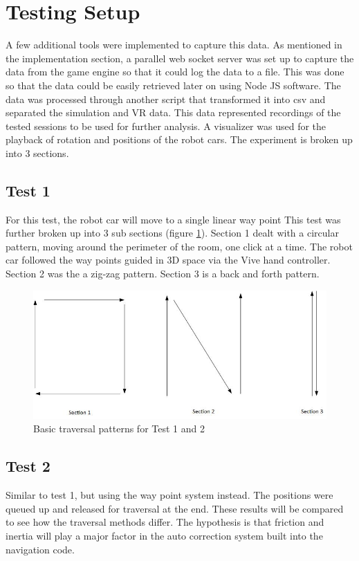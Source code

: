 \documentclass[10pt,a4paper]{article}
\begin{document}
	\section{Testing Setup}
	A few additional tools were implemented to capture this data. As mentioned in the implementation section, a parallel web socket server was set up to capture the data from the game engine so that it could log the data to a file. This was done so that the data could be easily retrieved later on using Node JS software. The data was processed through another script that transformed it into csv and separated the simulation and VR data. This data represented recordings of the tested sessions to be used for further analysis. A visualizer was used for the playback of rotation and positions of the robot cars. The experiment is broken up into 3 sections.
	
	\subsection{Test 1}
	For this test, the robot car will move to a single linear way point This test was further broken up into 3 sub sections (figure \ref{fig:traversal_patterns}). Section 1 dealt with a circular pattern, moving around the perimeter of the room, one click at a time. The robot car followed the way points guided in 3D space via the Vive hand controller. Section 2 was the a zig-zag pattern. Section 3 is a back and forth pattern.
		
	\begin{figure}
		\centering
		\includegraphics[width=.6\textwidth]{basic_traversal.jpg}
		\caption{Basic traversal patterns for Test 1 and 2}
		\label{fig:traversal_patterns}
	\end{figure}

	\subsection{Test 2}
	Similar to test 1, but using the way point system instead. The positions were queued up and released for traversal at the end. These results will be compared to see how the traversal methods differ. The hypothesis is that friction and inertia will play a major factor in the auto correction system built into the navigation code.
	
\end{document}
